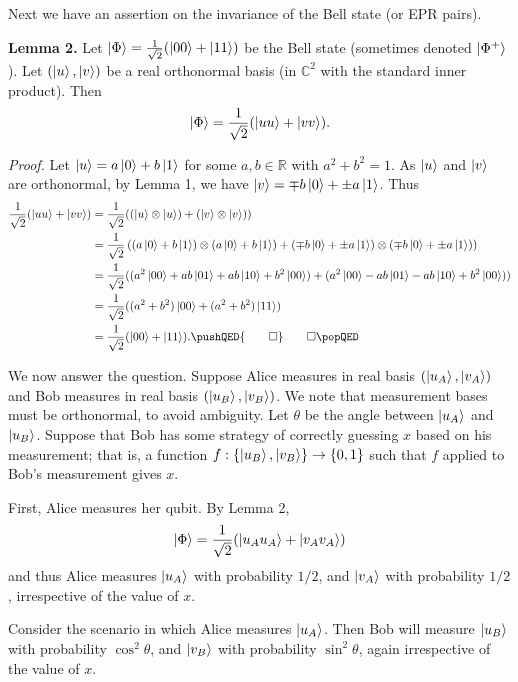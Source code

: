 \begin{solution}
    Next we have an assertion on the invariance of the Bell state (or EPR pairs).

    \textbf{Lemma 2.} Let $\ket\Phi = \frac{1}{\sqrt 2}(\ket{00} + \ket{11})$ be the Bell state (sometimes denoted $\ket{\Phi^+}$). Let $(\ket u, \ket v)$ be a real orthonormal basis (in $\mathbb C^2$ with the standard inner product). Then
    \[ \ket\Phi = \frac{1}{\sqrt 2}(\ket{uu} + \ket{vv}). \]

    \textit{Proof.} Let $\ket u = a\ket0 + b\ket1$ for some $a, b \in \mathbb R$ with $a^2 + b^2 = 1$. As $\ket u$ and $\ket v$ are orthonormal, by Lemma 1, we have $\ket v = \mp b\ket0 + \pm a\ket1$. Thus
    \begin{align*}
        \frac{1}{\sqrt2} (\ket{uu} + \ket{vv})
         & = \frac{1}{\sqrt2}(
        (\ket u \otimes \ket u) +
        (\ket v \otimes \ket v)
        )
        \\
         & = \frac{1}{\sqrt2}\left(
        (a\ket0 + b\ket1) \otimes (a\ket0 + b\ket1) +
        (\mp b\ket0 + \pm a\ket1) \otimes (\mp b\ket0 + \pm a\ket1)
        \right)
        \\
         & = \frac{1}{\sqrt 2}(
        (a^2\ket{00} + ab\ket{01} + ab\ket{10} + b^2\ket{00}) +
        (a^2\ket{00} - ab\ket{01} - ab\ket{10} + b^2\ket{00})
        )
        \\
         & = \frac{1}{\sqrt 2} (
        (a^2 + b^2)\ket{00} + (a^2 + b^2)\ket{11}
        )
        \\
         & = \frac{1}{\sqrt 2}(\ket{00} + \ket{11}).
        \pushQED{\qed}
        \qedhere
        \popQED
    \end{align*}

    We now answer the question. Suppose Alice measures in real basis $(\ket{u_A}, \ket{v_A})$ and Bob measures in real basis $(\ket{u_B}, \ket{v_B})$. We note that measurement bases must be orthonormal, to avoid ambiguity. Let $\theta$ be the angle between $\ket{u_A}$ and $\ket{u_B}$. Suppose that Bob has some strategy of correctly guessing $x$ based on his measurement; that is, a function $f: \{\ket{u_B}, \ket{v_B}\} \to \{0,1\}$ such that $f$ applied to Bob's measurement gives $x$.

    First, Alice measures her qubit. By Lemma 2,
    \[ \ket\Phi = \frac{1}{\sqrt 2}(\ket{u_Au_A} + \ket{v_Av_A}) \]
    and thus Alice measures $\ket{u_A}$ with probability $1/2$, and $\ket{v_A}$ with probability $1/2$, irrespective of the value of $x$.

    Consider the scenario in which Alice measures $\ket{u_A}$. Then Bob will measure $\ket{u_B}$ with probability $\cos^2\theta$, and $\ket{v_B}$ with probability $\sin^2\theta$, again irrespective of the value of $x$.


\end{solution}
